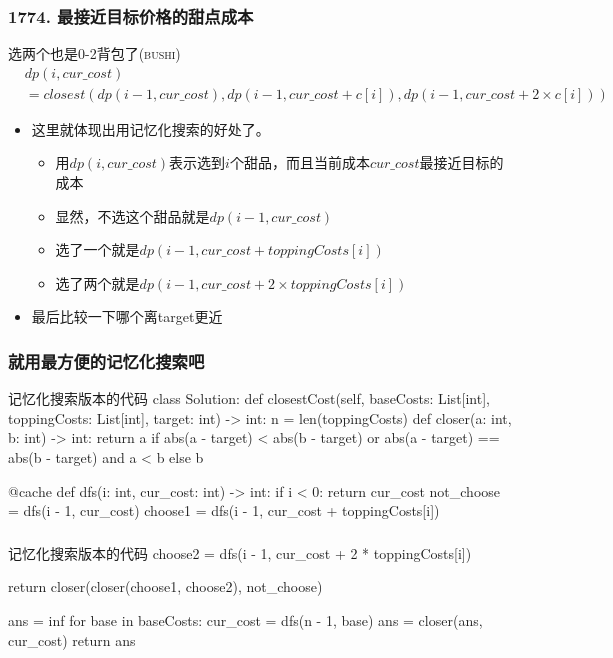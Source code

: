 \begin{frame}[fragile]          %
  \frametitle{\textsc{1774. 最接近目标价格的甜点成本}}
  \begin{alertblock}{选两个也是0-2背包了(\textsc{bushi})}
    \begin{align}
      & dp(i,cur\_cost) \\
      & = closest(dp(i-1,cur\_cost),dp(i-1,cur\_cost+c[i]),dp(i-1,cur\_cost+2 \times c[i]))
    \end{align}
  \end{alertblock}
  \begin{itemize}
    \item 这里就体现出用记忆化搜索的好处了。
    \begin{itemize}
      \item 用$dp(i,cur\_cost)$表示选到$i$个甜品，而且当前成本$cur\_cost$最接近目标的成本
      \item 显然，不选这个甜品就是$dp(i-1,cur\_cost)$
      \item 选了一个就是$dp(i-1,cur\_cost+toppingCosts[i])$
      \item 选了两个就是$dp(i-1,cur\_cost+2 \times toppingCosts[i])$
    \end{itemize}
    \item 最后比较一下哪个离target更近
  \end{itemize}
\end{frame}


\begin{frame}[fragile]
  \frametitle{就用最方便的记忆化搜索吧}
  \begin{codeblock}[language=python]{记忆化搜索版本的代码}
class Solution:
    def closestCost(self, baseCosts: List[int], toppingCosts: List[int], target: int) -> int:
        n = len(toppingCosts)
        def closer(a: int, b: int) -> int:
            return a if abs(a - target) < abs(b - target) or abs(a - target) == abs(b - target) and a < b else b
        
        @cache
        def dfs(i: int, cur_cost: int) -> int:
            if i < 0:
                return cur_cost
            not_choose = dfs(i - 1, cur_cost)
            choose1 = dfs(i - 1, cur_cost + toppingCosts[i])
  \end{codeblock}
\end{frame}

\begin{frame}[fragile]
  \frametitle{}
  \begin{codeblock}[language=python]{记忆化搜索版本的代码}
            choose2 = dfs(i - 1, cur_cost + 2 * toppingCosts[i])
            
          return closer(closer(choose1, choose2), not_choose)

        ans = inf
        for base in baseCosts:
          cur_cost = dfs(n - 1, base)
          ans = closer(ans, cur_cost)
        return ans
  \end{codeblock}
\end{frame}


